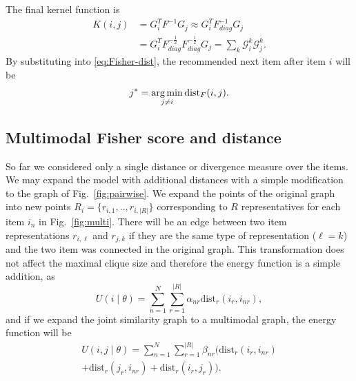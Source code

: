 The final kernel function is
%
\begin{equation}
\begin{split}
K(i,j) &= G_i^T F^{-1} G_j \approx G_i^T F_{diag}^{-1} G_j \\
	   &= G_i^T F_{diag}^{-\frac 12} F_{diag}^{-\frac 12} G_j = \sum_k \mathcal{G}_i^k \mathcal{G}_j^k.
\end{split}
\nonumber
\end{equation}
By substituting into \eqref{eq:Fisher-dist}, the recommended next item after item $i$ will be
%
\begin{equation}
j^{*} = \operatorname*{arg\,min}_{j \neq i} \text{dist}_F(i,j).
\nonumber 
\end{equation}

\subsection{Multimodal Fisher score and distance}
\label{sec:fish_comb}

So far we considered only a single distance or divergence measure over the items. We may expand the model with additional distances with a simple modification to the graph of Fig.~\ref{fig:pairwise}. 
We expand the points of the original graph into new points $R_i=\{r_{i,1},..,r_{i,|R|}\}$ corresponding to $R$ representatives for each item $i_n$ in Fig.~\ref{fig:multi}. There will be an edge between two item representations $r_{i,\ell}$ and $r_{j,k}$ if they are the same type of representation ($\ell=k$) and the two item was connected in the original graph. This transformation does not affect the maximal clique size and therefore the energy function is a simple addition, as
%
\begin{equation}
U(i \mid \theta) = \sum_{n=1}^{N} \sum_{r=1}^{|R|} \alpha_{nr} \mbox{dist}_r(i_r,i_{nr}),
\label{eq:potential_multi}
\end{equation}
% 
and if we expand the joint similarity graph to a multimodal graph, the energy function will be
%
\begin{equation}
\begin{split}
\label{eq:potential_joined_multi}
U(i,j \mid \theta) = \sum_{n=1}^{N} \sum_{r=1}^{|R|} \beta_{nr} (\mbox{dist}_r(i_r,i_{nr}) \\
+ \mbox{dist}_r(j_r,i_{nr}) + \mbox{dist}_r(i_r,j_r)).
\end{split}
\end{equation}

